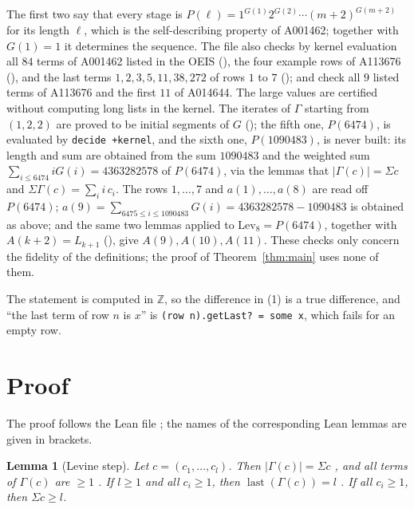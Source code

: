 \documentclass[11pt]{amsart}
\theoremstyle{plain}
\newtheorem{lemma}[theorem]{Lemma}
\theoremstyle{definition}
\newcommand{\Z}{\mathbb{Z}}
\newcommand{\Lev}{\mathrm{Lev}}
\newcommand{\last}{\operatorname{last}}
\newcommand{\len}[1]{\lvert #1\rvert}
\begin{document}
The first two say that every stage is $P(\ell)=1^{G(1)}2^{G(2)}\cdots(m+2)^{G(m+2)}$ for its length $\ell$, which is the self-describing property of A001462; together with $G(1)=1$ it determines the sequence. The file also checks by kernel evaluation all $84$ terms of A001462 listed in the OEIS (), the four example rows of A113676 (), and the last terms $1,2,3,5,11,38,272$ of rows $1$ to $7$ ();  and  check all $9$ listed terms of A113676 and the first $11$ of A014644.
The large values are certified without computing long lists in the kernel. The iterates of $\Gamma$ starting from $(1,2,2)$ are proved to be initial segments of $G$ (); the fifth one, $P(6474)$, is evaluated by \texttt{decide +kernel}, and the sixth one, $P(1090483)$, is never built: its length and sum are obtained from the sum $1090483$ and the weighted sum $\sum_{i\le 6474}iG(i)=4363282578$ of $P(6474)$, via the lemmas that $\len{\Gamma(c)}=\Sigma c$ and $\Sigma\Gamma(c)=\sum_i i\,c_i$. The rows $1,\dots,7$ and $a(1),\dots,a(8)$ are read off $P(6474)$; $a(9)=\sum_{6475\le i\le 1090483}G(i)=4363282578-1090483$ is obtained as above; and the same two lemmas applied to $\Lev_8=P(6474)$, together with $A(k+2)=L_{k+1}$ (), give $A(9),A(10),A(11)$. These checks only concern the fidelity of the definitions; the proof of Theorem~\ref{thm:main} uses none of them.

The statement is computed in $\Z$, so the difference in (1) is a true difference, and ``the last term of row $n$ is $x$'' is \texttt{(row n).getLast? = some x}, which fails for an empty row.

\section{Proof}\label{sec:proof}

The proof follows the Lean file ; the names of the corresponding Lean lemmas are given in brackets.

\begin{lemma}[Levine step]\label{lem:gamma}
Let $c=(c_1,\dots,c_l)$. Then $\len{\Gamma(c)}=\Sigma c$ {}, and all terms of $\Gamma(c)$ are $\ge1$ {}. If $l\ge1$ and all $c_i\ge1$, then $\last(\Gamma(c))=l$ {}. If all $c_i\ge1$, then $\Sigma c\ge l$.
\end{lemma}
\end{document}
